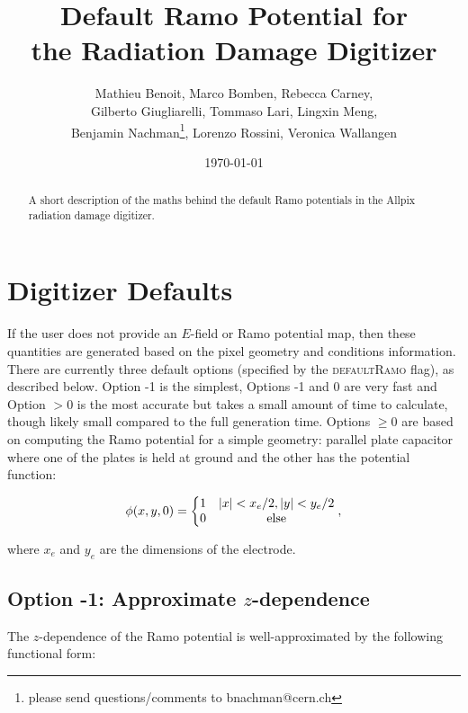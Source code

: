 \documentclass[12pt]{article}
\date{\today}
\begin{document}
\title{Default Ramo Potential for \\ the Radiation Damage Digitizer}
\author{Mathieu Benoit, Marco Bomben, Rebecca Carney,  \\Gilberto Giugliarelli, Tommaso Lari, Lingxin Meng, \\ Benjamin Nachman\footnote{please send questions/comments to bnachman@cern.ch}, Lorenzo Rossini, Veronica Wallangen}
\maketitle

\begin{abstract}
A short description of the maths behind the default Ramo potentials in the Allpix radiation damage digitizer.
\end{abstract}

\section{Digitizer Defaults}

If the user does not provide an $E$-field or Ramo potential map, then these quantities are generated based on the pixel geometry and conditions information.  There are currently three default options (specified by the \textsc{defaultRamo} flag), as described below.  Option -1 is the simplest, Options -1 and 0 are very fast and Option $>0$ is the most accurate but takes a small amount of time to calculate, though likely small compared to the full generation time.  Options $\geq 0$ are based on computing the Ramo potential for a simple geometry: parallel plate capacitor where one of the plates is held at ground and the other has the potential function:

\begin{align}
\label{eq:setup}
\phi(x,y,0)=\left\{\begin{matrix}1 & |x|<x_e/2, |y|<y_e/2\cr 0 &\text{else}\end{matrix}\right.,
\end{align}

\noindent where $x_e$ and $y_e$ are the dimensions of the electrode.

\clearpage

\subsection{Option -1: Approximate $z$-dependence}

The $z$-dependence of the Ramo potential is well-approximated by the following functional form:
\end{document}
